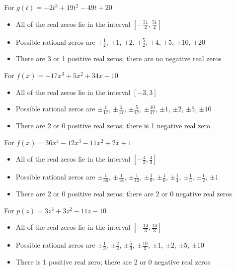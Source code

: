 \begin{exenum}
\item For   $g(t) = -2t^{3} + 19t^{2} - 49t + 20$
\begin{itemize}
\item  All of the real zeros lie in the interval $\left[-\frac{51}{2},\frac{51}{2} \right]$
\item  Possible rational zeros are  $\pm \frac{1}{2}$, $\pm 1$, $\pm 2$, $\pm \frac{5}{2}$, $\pm 4$, $\pm 5$, $\pm 10$, $\pm 20$ 
\item  There are 3 or 1 positive real zeros;  there are no negative real zeros
\end{itemize}

\item For   $f(x) = -17x^{3} + 5x^{2} + 34x - 10$
\begin{itemize}
\item  All of the real zeros lie in the interval $[-3,3]$
\item  Possible rational zeros are $\pm \frac{1}{17}$, $\pm \frac{2}{17}$, $\pm \frac{5}{17}$, $\pm \frac{10}{17}$, $\pm 1$, $\pm 2$, $\pm 5$, $\pm 10$
\item  There are 2 or 0 positive real zeros;  there is 1 negative real zero
\end{itemize}

\item For   $f(x) = 36x^{4} - 12x^{3} - 11x^{2} + 2x + 1$
\begin{itemize}
\item  All of the real zeros lie in the interval $\left[-\frac{4}{3},\frac{4}{3}\right]$
\item  Possible rational zeros are $\pm \frac{1}{36}$, $\pm \frac{1}{18}$, $\pm \frac{1}{12}$, $\pm \frac{1}{9}$, $\pm \frac{1}{6}$, $\pm \frac{1}{4}$, $\pm \frac{1}{3}$, $\pm \frac{1}{2}$, $\pm 1$
\item  There are 2 or 0 positive real zeros;  there are 2 or 0 negative real zeros
\end{itemize}

\item For   $p(z) = 3z^{3} + 3z^{2} - 11z - 10$
\begin{itemize}
\item  All of the real zeros lie in the interval $\left[-\frac{14}{3},\frac{14}{3}\right]$
\item  Possible rational zeros are $\pm \frac{1}{3}$, $\pm \frac{2}{3}$, $\pm \frac{5}{3}$, $\pm \frac{10}{3}$, $\pm 1$, $\pm 2$, $\pm 5$, $\pm 10$
\item  There is 1 positive real zero;  there are 2 or 0 negative real zeros
\end{itemize}


\end{exenum}
